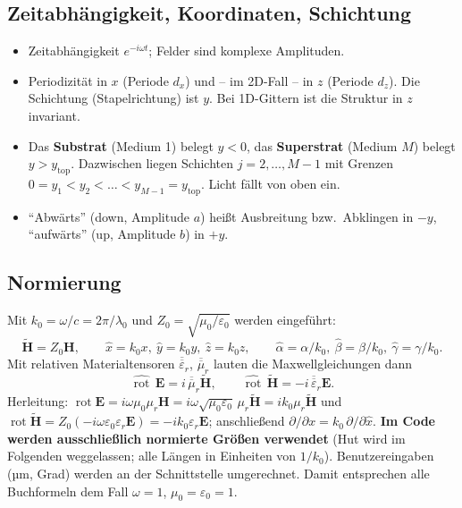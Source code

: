 \subsection{Zeitabhängigkeit, Koordinaten, Schichtung}
\begin{itemize}[nosep]
  \item Zeitabhängigkeit $e^{-i\omega t}$; Felder sind komplexe Amplituden.
  \item Periodizität in $x$ (Periode $d_x$) und -- im 2D-Fall -- in $z$ (Periode $d_z$). Die
        Schichtung (Stapelrichtung) ist $y$. Bei 1D-Gittern ist die Struktur in $z$ invariant.
  \item Das \textbf{Substrat} (Medium 1) belegt $y<0$, das \textbf{Superstrat} (Medium $M$) belegt
        $y>y_{\text{top}}$. Dazwischen liegen Schichten $j=2,\dots,M-1$ mit Grenzen
        $0=y_1<y_2<\dots<y_{M-1}=y_{\text{top}}$. Licht fällt von oben ein.
  \item \enquote{Abwärts} (down, Amplitude $a$) heißt Ausbreitung bzw.\ Abklingen in $-y$,
        \enquote{aufwärts} (up, Amplitude $b$) in $+y$.
\end{itemize}

\subsection{Normierung}
Mit $k_0=\omega/c=2\pi/\lambda_0$ und $Z_0=\sqrt{\mu_0/\varepsilon_0}$ werden eingeführt:
\begin{equation}
  \tilde{\mathbf H}=Z_0\mathbf H,\qquad
  \hat x=k_0x,\ \hat y=k_0y,\ \hat z=k_0z,\qquad
  \hat\alpha=\alpha/k_0,\ \hat\beta=\beta/k_0,\ \hat\gamma=\gamma/k_0 .
  \label{eq:norm}
\end{equation}
Mit relativen Materialtensoren $\overline{\overline\varepsilon}_r$, $\overline{\overline\mu}_r$ lauten die
Maxwellgleichungen dann
\begin{equation}
  \widehat{\operatorname{rot}}\,\mathbf E=i\,\overline{\overline\mu}_r\tilde{\mathbf H},\qquad
  \widehat{\operatorname{rot}}\,\tilde{\mathbf H}=-i\,\overline{\overline\varepsilon}_r\mathbf E .
  \label{eq:maxwell_norm}
\end{equation}
Herleitung: $\operatorname{rot}\mathbf E=i\omega\mu_0\mu_r\mathbf H=i\omega\sqrt{\mu_0\varepsilon_0}\,\mu_r\tilde{\mathbf H}
=ik_0\mu_r\tilde{\mathbf H}$ und
$\operatorname{rot}\tilde{\mathbf H}=Z_0(-i\omega\varepsilon_0\varepsilon_r\mathbf E)=-ik_0\varepsilon_r\mathbf E$;
anschließend $\partial/\partial x=k_0\,\partial/\partial\hat x$.
\textbf{Im Code werden ausschließlich normierte Größen verwendet} (Hut wird im Folgenden weggelassen;
alle Längen in Einheiten von $1/k_0$). Benutzereingaben (µm, Grad) werden an der Schnittstelle
umgerechnet. Damit entsprechen alle Buchformeln dem Fall $\omega=1$, $\mu_0=\varepsilon_0=1$.

